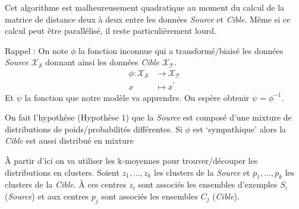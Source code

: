 Cet algorithme est malheureusement quadratique au moment du calcul de la 
matrice de distance deux à deux entre les données \emph{Source} et \emph{Cible}.
Même si ce calcul peut être parallélisé, il reste particulièrement lourd.



Rappel : 
On note $\phi$ la fonction inconnue qui a transformé/biaisé les données \emph{Source}
$\mathcal{X_S}$ donnant ainsi les données \emph{Cible} $\mathcal{X_T}$.
\begin{align*}
\phi : \mathcal{X_S}  &\to \mathcal{X_T} \\
                  x &\mapsto x^\prime
\end{align*}
Et $\psi$ la fonction que notre modèle va apprendre. On espère obtenir
$\psi = \phi^{-1}$.

On fait l'hypothèse (Hypothèse 1) que la \emph{Source} est composé d'une 
mixture de distributions de poids/probabilités différentes.
Si $\phi$ est `sympathique' alors la \emph{Cible} est aussi distribué en mixture

À partir d'ici on va utiliser les k-moyennes pour trouver/découper les 
distributions en clusters. Soient $z_1,...,z_k$ les clusters de la \emph{Source}
et $p_1, ..., p_k$ les clusters de la \emph{Cible}. À ces centres $z_i$ sont associés
les ensembles d'exemples $S_i$ (\emph{Source}) et aux centres $p_j$ sont associés
les ensembles $C_j$ (\emph{Cible}).

